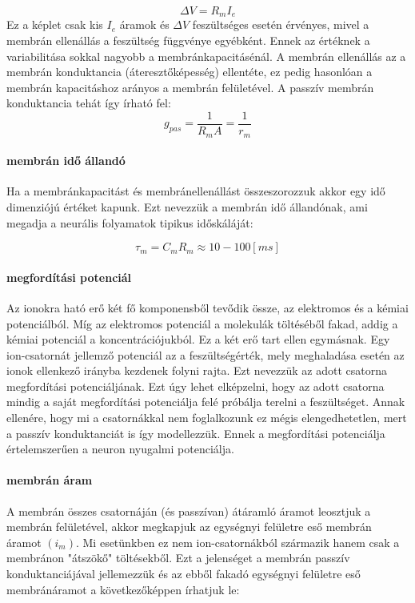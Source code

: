 \begin{equation}\label{eq:Rm}
	\Delta V = R_m I_e
\end{equation}
Ez a képlet csak kis $I_e$ áramok és $\Delta V$ feszültséges esetén érvényes, mivel a membrán ellenállás a feszültség függvénye egyébként.
Ennek az értéknek a variabilitása sokkal nagyobb a membránkapacitásénál. A membrán ellenállás az a membrán konduktancia (áteresztőképesség) ellentéte, ez pedig hasonlóan a membrán kapacitáshoz arányos a membrán felületével. A passzív membrán konduktancia tehát így írható fel:
\begin{equation}\label{eq:gpas}
	g_{pas} = \dfrac{1}{R_m A} = \dfrac{1}{r_m}
\end{equation}

\paragraph{membrán idő állandó}\label{par:tau}
Ha a membránkapacitást és membránellenállást összeszorozzuk akkor egy idő dimenziójú értéket kapunk. Ezt nevezzük a membrán idő állandónak, ami megadja a neurális folyamatok tipikus időskáláját:

\begin{equation}
	\tau_m = C_m R_m \approx 10-100 \left[ ms \right]
\end{equation}

\paragraph{megfordítási potenciál}
Az ionokra ható erő két fő komponensből tevődik össze, az elektromos és a kémiai potenciálból. Míg az elektromos potenciál a molekulák töltéséből fakad, addig a kémiai potenciál a koncentrációjukból. Ez a két erő tart ellen egymásnak. Egy ion-csatornát jellemző potenciál az a feszültségérték, mely meghaladása esetén az ionok ellenkező irányba kezdenek folyni rajta. Ezt nevezzük az adott csatorna megfordítási potenciáljának. Ezt úgy lehet elképzelni, hogy az adott csatorna mindig a saját megfordítási potenciálja felé próbálja terelni a feszültséget.
Annak ellenére, hogy mi a csatornákkal nem foglalkozunk ez mégis elengedhetetlen, mert a passzív konduktanciát is így modellezzük. Ennek a megfordítási potenciálja értelemszerűen a neuron nyugalmi potenciálja.

\paragraph{membrán áram}
A membrán összes csatornáján (és passzívan) átáramló áramot leosztjuk a membrán felületével, akkor megkapjuk az egységnyi felületre eső membrán áramot $(i_m)$. Mi esetünkben ez nem ion-csatornákból származik hanem csak a membránon "átszökő" töltésekből. Ezt a jelenséget a membrán passzív konduktanciájával jellemezzük és az ebből fakadó egységnyi felületre eső membránáramot a következőképpen írhatjuk le:


